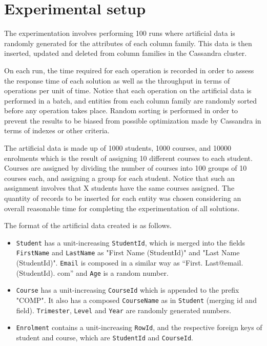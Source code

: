 \section{Experimental setup}\label{sexp:ExperimentalSetup}


The experimentation involves performing 100 runs where artificial data is
randomly generated for the attributes of each column family.  
This data is then inserted, 
updated and deleted from column families in the Cassandra cluster. 

On each run,  the time required for each operation is recorded in order to assess
the response time of each solution as well as the throughput in terms of
operations per unit of time.  Notice that each operation on the artificial data 
is performed in a batch,  and entities from each column family are randomly
sorted before any operation takes place.  Random sorting is performed in order to
prevent the results to be biased from possible optimization made by Cassandra in
terms of indexes or other criteria. 
		
The artificial data is made up of 1000 students,  1000 courses,  and 10000
enrolments which is the result of assigning 10 different courses to each
student.  Courses are assigned by dividing the number of courses
into 100 groups of 10 courses each,  and assigning a group for each student. 
Notice that such an assignment involves that X students have the same courses
assigned.  The quantity of records to be inserted for each entity was chosen
considering an overall reasonable time for completing the experimentation of all
solutions. 
		
The format of the artificial data created is as follows.  
	\begin{itemize}
	  
		  \item \texttt{Student} has a
		unit-increasing \texttt{StudentId},  which is merged into the fields \texttt{FirstName}
		 and \texttt{LastName} as "First Name (StudentId)" and "Last Name
		(StudentId)".  \texttt{Email} is composed in a similar way as
		``First. Last@email. (StudentId). com'' and \texttt{Age} is a random number. 
		
		\item  \texttt{Course} has a unit-increasing \texttt{CourseId} which is
		appended to the prefix "COMP".  It also has a composed \texttt{CourseName} as
		in \texttt{Student} (merging id and field).  \texttt{Trimester},  \texttt{Level}
		and \texttt{Year} are randomly generated numbers. 
		
		\item  \texttt{Enrolment} contains a unit-increasing \texttt{RowId},  and the
		respective foreign keys of student and course,  which are \texttt{StudentId}
		and \texttt{CourseId}. 
		
	\end{itemize}

